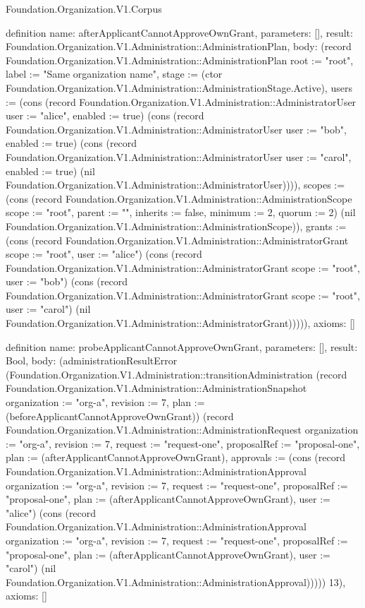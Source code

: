 \begin{lexlean}{Foundation.Organization.V1.Corpus}
\begin{semanticmodule}
definition{
  name: afterApplicantCannotApproveOwnGrant,
  parameters: [],
  result: Foundation.Organization.V1.Administration::AdministrationPlan,
  body: (record Foundation.Organization.V1.Administration::AdministrationPlan {root := "root", label := "Same organization name", stage := (ctor Foundation.Organization.V1.Administration::AdministrationStage.Active), users := (cons (record Foundation.Organization.V1.Administration::AdministratorUser {user := "alice", enabled := true}) (cons (record Foundation.Organization.V1.Administration::AdministratorUser {user := "bob", enabled := true}) (cons (record Foundation.Organization.V1.Administration::AdministratorUser {user := "carol", enabled := true}) (nil Foundation.Organization.V1.Administration::AdministratorUser)))), scopes := (cons (record Foundation.Organization.V1.Administration::AdministrationScope {scope := "root", parent := "", inherits := false, minimum := 2, quorum := 2}) (nil Foundation.Organization.V1.Administration::AdministrationScope)), grants := (cons (record Foundation.Organization.V1.Administration::AdministratorGrant {scope := "root", user := "alice"}) (cons (record Foundation.Organization.V1.Administration::AdministratorGrant {scope := "root", user := "bob"}) (cons (record Foundation.Organization.V1.Administration::AdministratorGrant {scope := "root", user := "carol"}) (nil Foundation.Organization.V1.Administration::AdministratorGrant))))}),
  axioms: []
}

definition{
  name: probeApplicantCannotApproveOwnGrant,
  parameters: [],
  result: Bool,
  body: (administrationResultError (Foundation.Organization.V1.Administration::transitionAdministration (record Foundation.Organization.V1.Administration::AdministrationSnapshot {organization := "org-a", revision := 7, plan := (beforeApplicantCannotApproveOwnGrant)}) (record Foundation.Organization.V1.Administration::AdministrationRequest {organization := "org-a", revision := 7, request := "request-one", proposalRef := "proposal-one", plan := (afterApplicantCannotApproveOwnGrant), approvals := (cons (record Foundation.Organization.V1.Administration::AdministrationApproval {organization := "org-a", revision := 7, request := "request-one", proposalRef := "proposal-one", plan := (afterApplicantCannotApproveOwnGrant), user := "alice"}) (cons (record Foundation.Organization.V1.Administration::AdministrationApproval {organization := "org-a", revision := 7, request := "request-one", proposalRef := "proposal-one", plan := (afterApplicantCannotApproveOwnGrant), user := "carol"}) (nil Foundation.Organization.V1.Administration::AdministrationApproval)))})) 13),
  axioms: []
}


\end{semanticmodule}
\end{lexlean}
